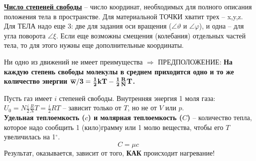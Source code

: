 \documentclass[12pt,epsfig,color,russian]{article}
\begin{document}
\underline{\bf Число степеней свободы} -- число координат, необходимых для пол\-но\-го описания положения тела в пространстве. Для материальной ТОЧКИ хватит трех -- x,y,z. Для ТЕЛА надо еще 3: две для задания оси вращения ($\angle\vartheta$ и $\angle\varphi$), и одна -- для угла поворота $\angle\xi$. Если еще возможны смещения (колебания) отдельных частей тела, то для этого нужны еще дополнитель\-ные координаты.

Ни одно из движений не имеет преимущества $\Rightarrow$ ПРЕДПОЛОЖЕНИЕ:
{\bf На каждую степень свободы молекулы в среднем приходится одно и то же количество энергии $\bf \overline{w}/3=\frac12kT-\frac12\frac RNT$.}

Пусть газ имеет $i$ степеней свободы. Внутренняя энергия 1 моля газа:
$U_0=N\frac i2\frac RNT = \frac i2RT $ -- зависит только от $T$, но не от $V$ или $p$.\\

{\bf Удельная теплоемкость ($c$) и молярная теплоемкость ($C$)} -- количество тепла, которое надо сообщить 1 (кило)грамму или 1 молю вещества, чтобы его $T$ увеличилась на 1$^\circ$.
\begin{displaymath}
C=\mu c
\end{displaymath}
Результат, оказывается, зависит от того, {\bf КАК} происходит нагревание!\\
\end{document}
